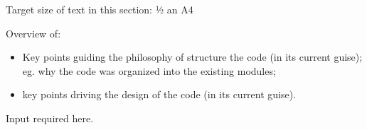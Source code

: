 \lbrack Target size of text in this section: ½ an A4\rbrack

Overview of:

\begin{itemize}
    \item Key points guiding the philosophy of structure the code (in its current guise); eg. why the code was organized into the existing modules;
    \item key points driving the design of the code (in its current guise).
\end{itemize}

\lbrack Input required here.\rbrack
